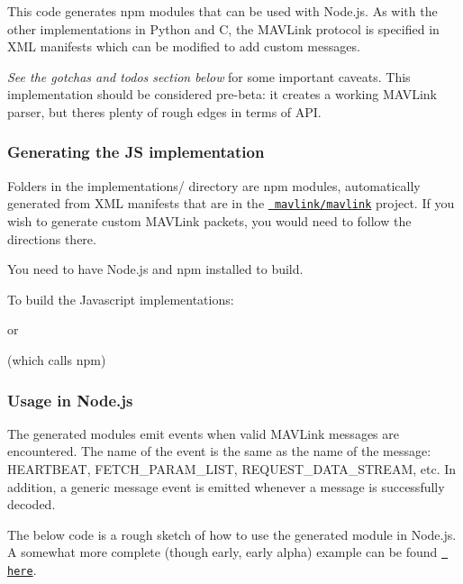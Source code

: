 This code generates {\ttfamily npm} modules that can be used with Node.\+js. As with the other implementations in Python and C, the M\+A\+V\+Link protocol is specified in X\+ML manifests which can be modified to add custom messages.

{\itshape See the gotcha\textquotesingle{}s and todo\textquotesingle{}s section below} for some important caveats. This implementation should be considered pre-\/beta\+: it creates a working M\+A\+V\+Link parser, but there\textquotesingle{}s plenty of rough edges in terms of A\+PI.

\subsubsection*{Generating the JS implementation}

Folders in the {\ttfamily implementations/} directory are {\ttfamily npm} modules, automatically generated from X\+ML manifests that are in the \href{https://github.com/mavlink/mavlink}{\texttt{ mavlink/mavlink}} project. If you wish to generate custom M\+A\+V\+Link packets, you would need to follow the directions there.

You need to have Node.\+js and npm installed to build.

To build the Javascript implementations\+:


\begin{DoxyCode}{0}
\end{DoxyCode}


or


\begin{DoxyCode}{0}
\end{DoxyCode}


(which calls npm)

\subsubsection*{Usage in Node.\+js}

The generated modules emit events when valid M\+A\+V\+Link messages are encountered. The name of the event is the same as the name of the message\+: {\ttfamily H\+E\+A\+R\+T\+B\+E\+AT}, {\ttfamily F\+E\+T\+C\+H\+\_\+\+P\+A\+R\+A\+M\+\_\+\+L\+I\+ST}, {\ttfamily R\+E\+Q\+U\+E\+S\+T\+\_\+\+D\+A\+T\+A\+\_\+\+S\+T\+R\+E\+AM}, etc. In addition, a generic {\ttfamily message} event is emitted whenever a message is successfully decoded.

The below code is a rough sketch of how to use the generated module in Node.\+js. A somewhat more complete (though early, early alpha) example can be found \href{https://github.com/acuasi/ground-control-station}{\texttt{ here}}.

